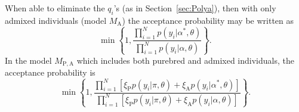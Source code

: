 \documentclass[11pt]{article}
\newcommand{\Ma}{M_\mathrm{A}}
\begin{document}
When able to eliminate the $q_i$'s (as in Section~\ref{sec:Polya}), then with only admixed
individuals (model $\Ma$) the acceptance probability may be written as
\begin{equation}
\min\left\{1,  
\frac{\prod_{i=1}^N p(y_i|\alpha^*,\theta)}
{\prod_{i=1}^N p(y_i|\alpha,\theta)} \right\}.
\end{equation}
In the model $M_\mathrm{P,A}$ which includes both purebred and admixed individuals,  the
acceptance probability is
\begin{equation}
\min\left\{1, 
\frac{\prod_{i=1}^N [\xi_\mathrm{P} p(y_i|\pi,\theta) + \xi_\mathrm{A}
p(y_i|\alpha^*,\theta)]} {\prod_{i=1}^N [\xi_\mathrm{P} p(y_i|\pi,\theta) + \xi_\mathrm{A}
p(y_i|\alpha,\theta)]} \right\}.
\end{equation}
\mbox{}\vspace*{1ex}
\mbox{}






\end{document}
